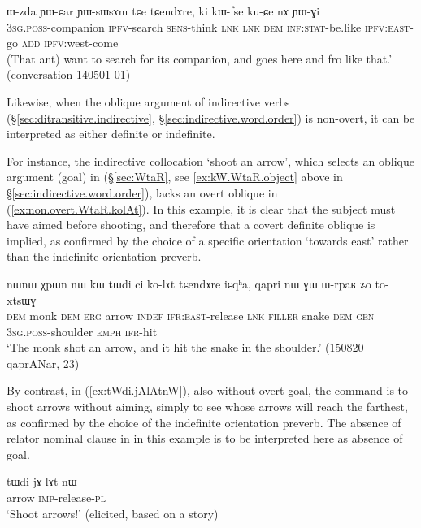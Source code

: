 \begin{exe}
\ex \label{ex:kuCe.nA.YWGi2}
\gll ɯ-zda ɲɯ-ɕar ɲɯ-sɯsɤm  tɕe tɕendɤre, ki kɯ-fse ku-ɕe nɤ ɲɯ-ɣi \\
\textsc{3sg}.\textsc{poss}-companion \textsc{ipfv}-search \textsc{sens}-think \textsc{lnk} \textsc{lnk} \textsc{dem} \textsc{inf}:\textsc{stat}-be.like \textsc{ipfv}:\textsc{east}-go \textsc{add} \textsc{ipfv}:west-come \\
\glt (That ant) want to search for its companion, and goes here and fro like that.' (conversation 140501-01)
\end{exe}

Likewise, when the oblique argument of indirective verbs (§\ref{sec:ditransitive.indirective}, §\ref{sec:indirective.word.order}) is non-overt, it can be interpreted as either definite or indefinite.

For instance, the indirective collocation  `shoot an arrow', which selects an oblique argument (goal) in  (§\ref{sec:WtaR}, see \ref{ex:kW.WtaR.object} above in §\ref{sec:indirective.word.order}), lacks an overt oblique in (\ref{ex:non.overt.WtaR.kolAt}). In this example, it is clear that the subject must have aimed before shooting, and therefore that a covert definite oblique is implied, as confirmed by the choice of a specific orientation `towards east' rather than the indefinite orientation preverb.

\begin{exe}
\ex \label{ex:non.overt.WtaR.kolAt}
\gll  nɯnɯ χpɯn nɯ kɯ tɯdi ci ko-lɤt tɕendɤre iɕqʰa,  qapri nɯ ɣɯ ɯ-rpaʁ ʑo to-xtsɯɣ \\
\textsc{dem} monk \textsc{dem} \textsc{erg} arrow \textsc{indef} \textsc{ifr}:\textsc{east}-release \textsc{lnk} \textsc{filler} snake \textsc{dem} \textsc{gen} \textsc{3sg}.\textsc{poss}-shoulder \textsc{emph} \textsc{ifr}-hit \\
\glt `The monk shot an arrow, and it hit the snake in the shoulder.' (150820 qaprANar, 23)
\end{exe}

By contrast, in (\ref{ex:tWdi.jAlAtnW}), also without overt goal, the command is to shoot arrows without aiming, simply to see whose arrows will reach the farthest, as confirmed by the choice of the indefinite orientation preverb. The absence of relator nominal clause in  in this example is to be interpreted here as absence of goal.

\begin{exe}
\ex \label{ex:tWdi.jAlAtnW}
\gll  tɯdi jɤ-lɤt-nɯ \\
arrow \textsc{imp}-release-\textsc{pl} \\
\glt `Shoot arrows!' (elicited, based on a story)
\end{exe}

